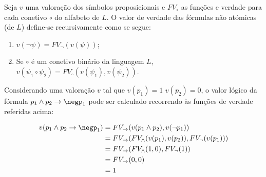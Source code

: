 Seja $v$ uma valoração dos símbolos proposicionais e $FV_\circ$ as funções e verdade para cada conetivo $\circ$ do alfabeto de $L$. O valor de verdade das fórmulas não atómicas (de $L$) define-se recursivamente como se segue:

\begin{enumerate}[label=(\roman*)]
    \item $v(\neg\psi)=FV_\neg(v(\psi))$;
    \item Se $\circ$ é um conetivo binário da linguagem $L$, $v(\psi_1 \circ \psi_2)=FV_\circ(v(\psi_1),v(\psi_2))$.
\end{enumerate}

Considerando uma valoração $v$ tal que $v(p_1)=1$ $v(p_2)=0$, o valor lógico da fórmula $p_1\land p_2 \to \negp_1$ pode ser calculado recorrendo às funções de verdade referidas acima:

    \begin{align*}
        v(p_1\land p_2 \to \negp_1)& =FV_{\to}(v(p_1\land p_2),v(\neg p_1)) \\
        & =FV_{\to}(FV_\land(v(p_1), v(p_2)), FV_\neg(v(p_1)))\\
        & =FV_{\to}(FV_\land(1,0),FV_\neg(1)) \\
        & =FV_{\to}(0,0) \\
        & =1
    \end{align*}